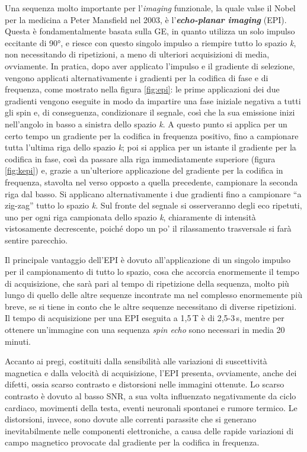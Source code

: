 \documentclass{report}
\newcommand{\virgolette}[1]{``#1''}
\newcommand{\figref}[1]{figura \ref{#1}}
\numberwithin{equation}{section}
\numberwithin{figure}{section}
\begin{document}
Una sequenza molto importante per l'\textit{imaging} funzionale, la quale valse il Nobel per la medicina a Peter Mansfield nel 2003, è l'\textbf{\textit{echo-planar imaging}} (EPI). Questa è fondamentalmente basata sulla GE, in quanto utilizza un solo impulso eccitante di 90°, e riesce con questo singolo impulso a riempire tutto lo spazio \textit{k}, non necessitando di ripetizioni, a meno di ulteriori acquisizioni di media, ovviamente. In pratica, dopo aver applicato l'impulso e il gradiente di selezione, vengono applicati alternativamente i gradienti per la codifica di fase e di frequenza, come mostrato nella \figref{fig:epi}: le prime applicazioni dei due gradienti vengono eseguite in modo da impartire una fase iniziale negativa a tutti gli spin e, di conseguenza, condizionare il segnale, così che la sua emissione inizi nell'angolo in basso a sinistra dello spazio \textit{k}. A questo punto si applica per un certo tempo un gradiente per la codifica in frequenza positivo, fino a campionare tutta l'ultima riga dello spazio \textit{k}; poi si applica per un istante il gradiente per la codifica in fase, così da passare alla riga immediatamente superiore (\figref{fig:kepi}) e, grazie a un'ulteriore applicazione del gradiente per la codifica in frequenza, stavolta nel verso opposto a quella precedente, campionare la seconda riga dal basso. Si applicano alternativamente i due gradienti fino a campionare \virgolette{a zig-zag} tutto lo spazio \textit{k}. Sul fronte del segnale si osserveranno degli eco ripetuti, uno per ogni riga campionata dello spazio \textit{k}, chiaramente di intensità vistosamente decrescente, poiché dopo un po' il rilassamento trasversale si farà sentire parecchio.

Il principale vantaggio dell'EPI è dovuto all'applicazione di un singolo impulso per il campionamento di tutto lo spazio, cosa che accorcia enormemente il tempo di acquisizione, che sarà pari al tempo di ripetizione della sequenza, molto più lungo di quello delle altre sequenze incontrate ma nel complesso enormemente più breve, se si tiene in conto che le altre sequenze necessitano di diverse ripetizioni. Il tempo di acquisizione per una EPI eseguita a 1,5\,T è di 2,5-3\,s, mentre per ottenere un'immagine con una sequenza \textit{spin echo} sono necessari in media 20 minuti.

Accanto ai pregi, costituiti dalla sensibilità alle variazioni di suscettività magnetica e dalla velocità di acquisizione, l'EPI presenta, ovviamente, anche dei difetti, ossia scarso contrasto e distorsioni nelle immagini ottenute. Lo scarso contrasto è dovuto al basso SNR, a sua volta influenzato negativamente da ciclo cardiaco, movimenti della testa, eventi neuronali spontanei e rumore termico. Le distorsioni, invece, sono dovute alle correnti parassite che si generano inevitabilmente nelle componenti elettroniche, a causa delle rapide variazioni di campo magnetico provocate dal gradiente per la codifica in frequenza.
\end{document}
